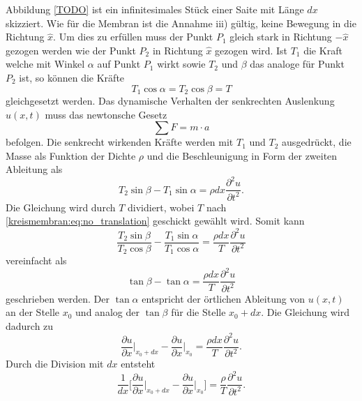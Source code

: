 Abbildung \ref{TODO} ist ein infinitesimales Stück einer Saite mit Länge $ dx $ skizziert.
Wie für die Membran ist die Annahme iii) gültig, keine Bewegung in die Richtung $ \hat{x} $.
Um dies zu erfüllen muss der Punkt $ P_1 $ gleich stark in Richtung $ -\hat{x} $ gezogen werden wie der Punkt $ P_2 $ in Richtung $ \hat{x} $ gezogen wird. Ist $ T_1 $ die Kraft welche mit Winkel $ \alpha $ auf Punkt $ P_1 $ wirkt sowie $ T_2 $ und $ \beta$ das analoge für Punkt $ P_2 $ ist, so können die Kräfte 
\begin{equation}\label{kreismembran:eq:no_translation}
	T_1 \cos \alpha = T_2 \cos \beta = T
\end{equation}
gleichgesetzt werden. 
Das dynamische Verhalten der senkrechten Auslenkung $ u(x,t) $ muss das newtonsche Gesetz 
\begin{equation*}
	\sum F = m \cdot a
\end{equation*} 
befolgen. Die senkrecht wirkenden Kräfte werden mit $ T_1 $ und $ T_2 $ ausgedrückt, die Masse als Funktion der Dichte $ \rho $ und die Beschleunigung in Form der zweiten Ableitung als
\begin{equation*}
	T_2 \sin \beta - T_1 \sin \alpha = \rho dx \frac{\partial^2 u}{\partial t^2} .
\end{equation*}
Die Gleichung wird durch $ T $ dividiert, wobei $ T $ nach \ref{kreismembran:eq:no_translation} geschickt gewählt wird. Somit kann
\begin{equation*}
	\frac{T_2 \sin \beta}{T_2 \cos \beta} - \frac{T_1 \sin \alpha}{T_1 \cos \alpha} = \frac{\rho dx}{T} \frac{\partial^2 u}{\partial t^2}
\end{equation*}
vereinfacht als  
\begin{equation*}
	\tan \beta - \tan \alpha = \frac{\rho dx}{T} \frac{\partial^2 u}{\partial t^2}
\end{equation*}
geschrieben werden. 
Der $ \tan \alpha $ entspricht der örtlichen Ableitung von $ u(x,t) $ an der Stelle $ x_0 $ und analog der $ \tan \beta $ für die Stelle $ x_0 + dx $.
Die Gleichung wird dadurch zu
\begin{equation*}
	\frac{\partial u}{\partial x} \bigg|_{x_0 + dx} - \frac{\partial u}{\partial x} \bigg|_{x_0} = \frac{\rho dx}{T} \frac{\partial^2 u}{\partial t^2}.
\end{equation*} 
Durch die Division mit $ dx $ entsteht 
\begin{equation*}
	\frac{1}{dx} \bigg[\frac{\partial u}{\partial x} \bigg|_{x_0 + dx} - \frac{\partial u}{\partial x} \bigg|_{x_0}\bigg] = \frac{\rho}{T}\frac{\partial^2 u}{\partial t^2}.
\end{equation*}
